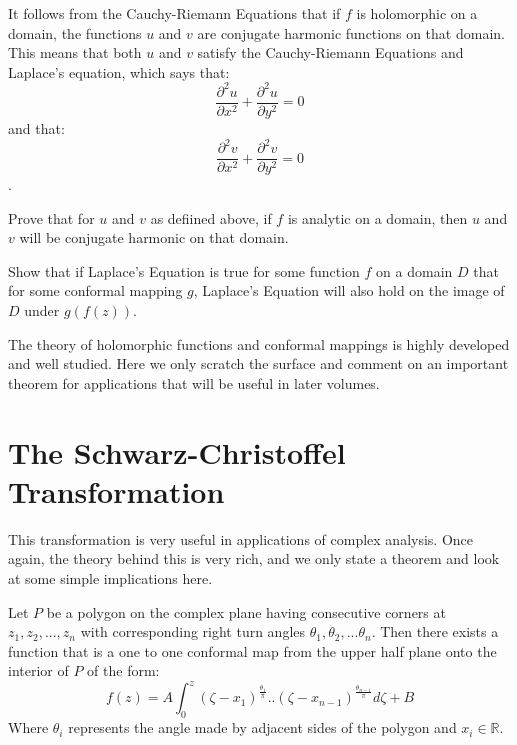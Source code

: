 It follows from the Cauchy-Riemann Equations that if $f$ is holomorphic on a domain, the functions $u$ and $v$ are conjugate harmonic functions on that domain. This means that both $u$ and $v$ satisfy the Cauchy-Riemann Equations and Laplace's equation, which says that: $$\frac{\partial^2 u}{\partial x^2}+\frac{\partial^2 u}{\partial y^2}=0$$ and that: $$\frac{\partial^2 v}{\partial x^2}+\frac{\partial^2 v}{\partial y^2}=0$$.

\begin{problem}
Prove that for $u$ and $v$ as defiined above, if $f$ is analytic on a domain, then $u$ and $v$ will be conjugate harmonic on that domain.
\end{problem}

\begin{problem}
Show that if Laplace's Equation is true for some function $f$ on a domain $D$ that for some conformal mapping $g$, Laplace's Equation will also hold on the image of $D$ under $g(f(z))$.
\end{problem}

The theory of holomorphic functions and conformal mappings is highly developed and well studied.  Here we only scratch the surface and comment on an important theorem for applications that will be useful in later volumes.


\section*{The Schwarz-Christoffel Transformation}
This transformation is very useful in applications of complex analysis.  Once again, the theory behind this is very rich, and we only state a theorem and look at some simple implications here.

\begin{theorem}  Let $P$ be a polygon on the complex plane having consecutive corners at $z_1, z_2, ..., z_n$ with corresponding right turn angles $\theta_1, \theta_2,...\theta_n$.  Then there exists a function that is a one to one conformal map from the upper half plane onto the interior of $P$ of the form:
\[
f(z) = A\int_0^z (\zeta - x_1)^{\frac{\theta_1}{\pi}}..(\zeta - x_{n-1})^{\frac{\theta_{n-1}}{\pi}}d\zeta + B
\]
Where $\theta_i$ represents the angle made by adjacent sides of the polygon and $x_i \in \mathbb{R}$.
\end{theorem}

